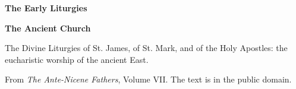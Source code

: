 \documentclass[11pt,letterpaper]{article}
\begin{document}
\color{ink}

\begin{titlepage}
\centering
\vspace*{4em}
{\LARGE\bfseries\color{heading} The Early Liturgies\par}
\vspace{2em}
{\Large\bfseries\color{heading} The Ancient Church\par}
\vspace{2.5em}
{\itshape\color{subhead}\parbox{0.8\linewidth}{\centering The Divine Liturgies of St. James, of St. Mark, and of the Holy Apostles: the eucharistic worship of the ancient East.\par}}
\vfill
{\small From \emph{The Ante-Nicene Fathers}, Volume VII. The text is in the public domain.\par}
\vspace{2em}
\end{titlepage}

\tableofcontents


\end{document}
